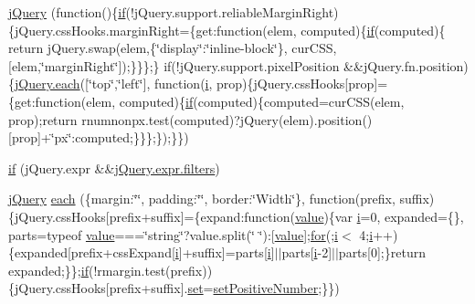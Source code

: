 \begin{DoxyCompactItemize}
\hyperlink{jquery-1_8x_8js_a41c2e1bff4a6b292938143764e31d789}{j\+Query} (function()\{\hyperlink{menu_2tpl_2js_2jquery_8jstree_8js_acba95bef569cfaee32c4ed0212b2bb92}{if}(!j\+Query.\+support.\+reliable\+Margin\+Right)\{j\+Query.\+css\+Hooks.\+margin\+Right=\{get\+:function(elem, computed)\{\hyperlink{menu_2tpl_2js_2jquery_8jstree_8js_acba95bef569cfaee32c4ed0212b2bb92}{if}(computed)\{   return j\+Query.\+swap(elem,\{\char`\"{}display\char`\"{}\+:\char`\"{}inline-\/block\char`\"{}\}, cur\+C\+SS, \mbox{[}elem,\char`\"{}margin\+Right\char`\"{}\mbox{]});\}\}\};\}       if(!j\+Query.\+support.\+pixel\+Position \&\&j\+Query.\+fn.\+position)\{\hyperlink{jquery_8min_8js_acac159895212e159f5cbd2080cc4d737}{j\+Query.\+each}(\mbox{[}\char`\"{}top\char`\"{},\char`\"{}left\char`\"{}\mbox{]}, function(\hyperlink{jqplot_8barRenderer_8min_8js_ad34c35dd1d1578d93d112c22c7726e0f}{i}, prop)\{j\+Query.\+css\+Hooks\mbox{[}prop\mbox{]}=\{get\+:function(elem, computed)\{\hyperlink{menu_2tpl_2js_2jquery_8jstree_8js_acba95bef569cfaee32c4ed0212b2bb92}{if}(computed)\{computed=cur\+C\+SS(elem, prop);return rnumnonpx.\+test(computed)?j\+Query(elem).position()\mbox{[}prop\mbox{]}+\char`\"{}px\char`\"{}\+:computed;\}\}\};\});\}\})
\item 
\hyperlink{jquery-1_8x_8js_a0335a19470806a284d8c38df8f5b5718}{if} (j\+Query.\+expr \&\&\hyperlink{xml__js__filter_8js_afe853b0bc0e280f7226e1b1a962ed91c}{j\+Query.\+expr.\+filters})
\item 
\hyperlink{xe__solid__enterprise__login_2js_2login_8js_a5d40f04b6bb824963a42ec4b5fbfe262}{j\+Query} \hyperlink{jquery-1_8x_8js_a4d613a6d16c025ab901ff536b58f9ecd}{each} (\{margin\+:\char`\"{}\char`\"{}, padding\+:\char`\"{}\char`\"{}, border\+:\char`\"{}Width\char`\"{}\}, function(prefix, suffix)\{j\+Query.\+css\+Hooks\mbox{[}prefix+suffix\mbox{]}=\{expand\+:function(\hyperlink{jquery_8js_abe5393d870043cf6aaa1d5ad5fce755c}{value})\{var \hyperlink{jqplot_8barRenderer_8min_8js_ad34c35dd1d1578d93d112c22c7726e0f}{i}=0, expanded=\{\}, parts=typeof \hyperlink{jquery_8js_abe5393d870043cf6aaa1d5ad5fce755c}{value}===\char`\"{}string\char`\"{}?value.\+split(\char`\"{} \char`\"{})\+:\mbox{[}\hyperlink{jquery_8js_abe5393d870043cf6aaa1d5ad5fce755c}{value}\mbox{]};\hyperlink{document__category_8js_aa303d4e538a4022d72a50a7ad8ee9799}{for}(;\hyperlink{jqplot_8barRenderer_8min_8js_ad34c35dd1d1578d93d112c22c7726e0f}{i}$<$ 4;\hyperlink{jqplot_8barRenderer_8min_8js_ad34c35dd1d1578d93d112c22c7726e0f}{i}++)\{expanded\mbox{[}prefix+css\+Expand\mbox{[}\hyperlink{jqplot_8barRenderer_8min_8js_ad34c35dd1d1578d93d112c22c7726e0f}{i}\mbox{]}+suffix\mbox{]}=parts\mbox{[}\hyperlink{jqplot_8barRenderer_8min_8js_ad34c35dd1d1578d93d112c22c7726e0f}{i}\mbox{]}$\vert$$\vert$parts\mbox{[}\hyperlink{jqplot_8barRenderer_8min_8js_ad34c35dd1d1578d93d112c22c7726e0f}{i}-\/2\mbox{]}$\vert$$\vert$parts\mbox{[}0\mbox{]};\}return expanded;\}\};\hyperlink{menu_2tpl_2js_2jquery_8jstree_8js_acba95bef569cfaee32c4ed0212b2bb92}{if}(!rmargin.\+test(prefix))\{j\+Query.\+css\+Hooks\mbox{[}prefix+suffix\mbox{]}.\hyperlink{jqplot_8categoryAxisRenderer_8min_8js_affb8afe88c48c8850caeb3facf06bc3e}{set}=\hyperlink{jquery-1_8x_8js_a049182834e8b4b2d7485cd919ed272d7}{set\+Positive\+Number};\}\})

\end{DoxyCompactItemize}
